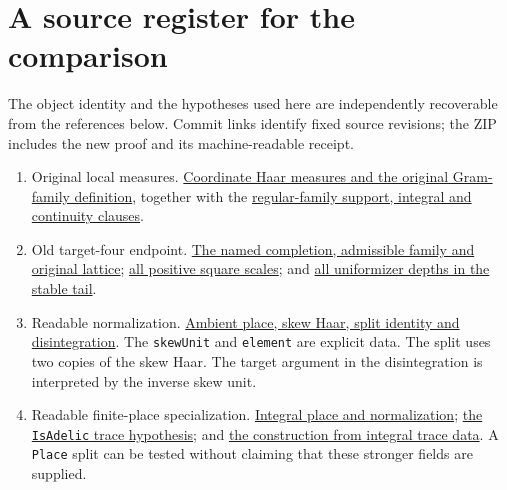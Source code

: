 \documentclass[12pt,letterpaper]{article}
\newcommand{\id}[1]{{\small\nolinkurl{#1}}}
\begin{document}
\section{A source register for the comparison}
The object identity and the hypotheses used here are independently recoverable from the references below. Commit links identify fixed source revisions; the ZIP includes the new proof and its machine-readable receipt.
\begin{enumerate}[leftmargin=1.55em]
\item Original local measures. \href{https://github.com/nousentllc/riemann-hypothesis/blob/40e56bab026552e089d7afcfeff08d2defb9c005/src/CompanionTheory/SpectralGeometry/CountingDefinitions/AdelicEulerProducts/IsEulerProd.lean}{Coordinate Haar measures and the original Gram-family definition}, together with the \href{https://github.com/nousentllc/riemann-hypothesis/blob/40e56bab026552e089d7afcfeff08d2defb9c005/src/Formalism/SharpRestriction/GlobalSchurBounds/GeneralLinearActions/GenusMassVolumes.lean}{regular-family support, integral and continuity clauses}.
\item Old target-four endpoint. \href{https://github.com/nousentllc/riemann-hypothesis/blob/17263859a4d27c62cfc67571737355f61a080806/research/uriel/experiments/ramified-square-dilates/bridge/RamPlaceEndpoint.lean}{The named completion, admissible family and original lattice}; \href{https://github.com/nousentllc/riemann-hypothesis/blob/17263859a4d27c62cfc67571737355f61a080806/research/uriel/experiments/ramified-square-dilates/dilates/DilateEndpoint.lean}{all positive square scales}; and \href{https://github.com/nousentllc/riemann-hypothesis/blob/17263859a4d27c62cfc67571737355f61a080806/research/uriel/experiments/ramified-square-dilates/dilates/DilateStableOddAll.lean}{all uniformizer depths in the stable tail}.
\item Readable normalization. \href{https://github.com/nousentllc/riemann-hypothesis/blob/e063a923620ee7787b4a1270421478645bf66bdb/src/Lib/General/Measure/QuadricDisintegration.lean}{Ambient place, skew Haar, split identity and disintegration}. The \id{skewUnit} and \id{element} are explicit data. The split uses two copies of the skew Haar. The target argument in the disintegration is interpreted by the inverse skew unit.
\item Readable finite-place specialization. \href{https://github.com/nousentllc/riemann-hypothesis/blob/e063a923620ee7787b4a1270421478645bf66bdb/src/Lib/SiegelWeil/OneVector/FinitePlaceDensity.lean}{Integral place and normalization}; \href{https://github.com/nousentllc/riemann-hypothesis/blob/e063a923620ee7787b4a1270421478645bf66bdb/src/Lib/General/LinearAlgebra/IntegralLattices.lean}{the \id{IsAdelic} trace hypothesis}; and \href{https://github.com/nousentllc/riemann-hypothesis/blob/e063a923620ee7787b4a1270421478645bf66bdb/src/New/Spanning/MainTerm/FillingLevel.lean}{the construction from integral trace data}. A \id{Place} split can be tested without claiming that these stronger fields are supplied.

\end{enumerate}
\end{document}
